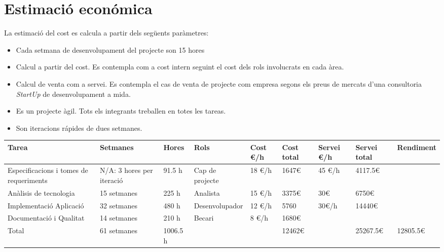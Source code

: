 \section{Estimaci\'{o} econ\'{o}mica}
La estimació del cost es calcula a partir dels següents paràmetres:
\begin{itemize}
\item Cada setmana de desenvolupament del projecte son 15 hores
\item Calcul a partir del cost. Es contempla com a cost intern seguint el cost dels rols involucrats en cada àrea.
\item Calcul de venta com a servei. Es contempla el cas de venta de projecte com empresa segons els preus de mercats d'una consultoria \textit{StartUp} de desenvolupament a mida.
\item Es un projecte àgil. Tots els integrants treballen en totes les tareas.
\item Son iteracions r\'{a}pides de dues setmanes.
\end{itemize}

\begin{table}
\begin{tabular}{|p{3cm}|p{2cm}|p{1cm}|p{3cm}|p{1cm}|p{2cm}|p{2cm}|p{2cm}|p{2cm}|}
\hline
Tarea & Setmanes & Hores & Rols & Cost \euro/h & Cost total & Servei \euro/h & Servei total & Rendiment \\ \hline
Especificacions i tomes de requeriments & N/A: 3 hores per iteració & 91.5 h & Cap de projecte & 18 \euro/h & 1647\euro & 45 \euro/h & 4117.5\euro & \\ \hline
Anàlisis de tecnologia & 15 setmanes & 225 h & Analista & 15 \euro/h & 3375\euro & 30\euro & 6750\euro & \\ \hline
Implementació Aplicació & 32 setmanes & 480 h & Desenvolupador & 12 \euro/h & 5760 & 30\euro/h & 14440\euro & \\ \hline
Documentació i Qualitat & 14 setmanes & 210 h & Becari & 8 \euro/h & 1680\euro & & & \\ \hline 
\hline
Total & 61 setmanes & 1006.5 h & & & 12462\euro & & 25267.5\euro & 12805.5\euro \\ \hline
\end{tabular}
\end{table}

